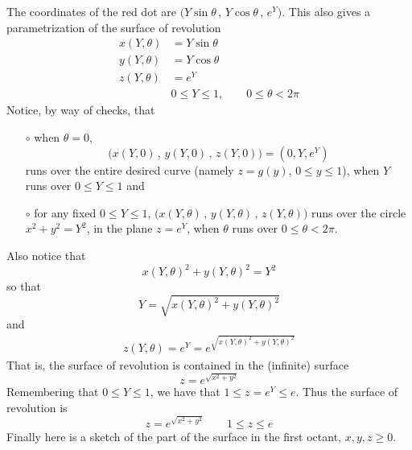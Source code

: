 \begin{eg}
\begin{nfig}
\begin{center}
\end{center}
\end{nfig}
The coordinates of the red dot are $\big(Y\sin\theta\,,\,Y\cos\theta\,,\,e^Y\big)$. This also gives 
a parametrization of the surface of revolution
\begin{align*}
x(Y,\theta) & = Y\sin\theta \\
y(Y,\theta) & = Y\cos\theta \\
z(Y,\theta) & = e^Y \\
&0\le Y\le 1,\qquad 0\le\theta<2\pi
\end{align*}
Notice, by way of checks, that
\begin{itemize}\itemsep1pt \parskip0pt  %
\item[$\circ$] when $\theta=0$, 
\begin{equation*}
    \big(x(Y,0)\,,\,y(Y,0)\,,\,z(Y,0)\big)
                 =(0,Y,e^Y)
\end{equation*}
runs over the entire desired curve (namely $z=g(y)$, $0\le y\le 1$),  
when $Y$ runs over $0\le Y\le 1$ and
\item[$\circ$] for any fixed $0\le Y\le 1$, 
   $\big(x(Y,\theta)\,,\,y(Y,\theta)\,,\,z(Y,\theta)\big)$ runs over the circle
       $x^2+y^2=Y^2$, in the plane $z=e^Y$, 
       when $\theta$ runs over $0\le\theta<2\pi$.
\end{itemize}
Also notice that
\begin{equation*}
x(Y,\theta)^2 + y(Y,\theta)^2 = Y^2
\end{equation*}
so that
\begin{equation*}
Y=\sqrt{x(Y,\theta)^2 + y(Y,\theta)^2}
\end{equation*}
and
\begin{align*}
z(Y,\theta) =e^{Y} = e^{ \sqrt{x(Y,\theta)^2 + y(Y,\theta)^2} }
\end{align*}
That is, the surface of revolution is contained in the (infinite) surface
\begin{equation*}
z=e^{\sqrt{x^2+y^2}}
\end{equation*}
Remembering that $0\le Y\le 1$, we have that $1\le z=e^Y \le e$. 
Thus the surface of revolution is
\begin{equation*}
z=e^{\sqrt{x^2+y^2}}\qquad 1\le z\le e
\end{equation*}
Finally here is a sketch of the part of the surface in the first octant,
$x,y,z\ge 0$.
\begin{nfig}
\begin{center}

\end{center}
\end{nfig}
\end{eg}
